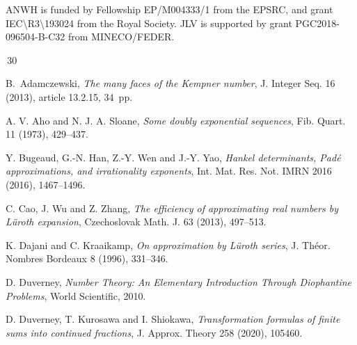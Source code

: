 \documentclass[12pt,a4paper]{amsart}
\theoremstyle{definition}
\numberwithin{equation}{section}
\begin{document}
ANWH is funded by Fellowship EP/M004333/1 from the EPSRC,  
and grant IEC\textbackslash R3\textbackslash 193024 from the Royal Society. 
JLV is supported by grant PGC2018-096504-B-C32 from MINECO/FEDER. 


\normalsize

\begin{thebibliography}{\,30\,}


\normalsize
\baselineskip=17pt

B.~Adamczewski, 
\textit{The many faces of the Kempner number}, 
J. Integer Seq. {16} (2013), article 13.2.15, 34~pp.

A. V. Aho and N. J. A. Sloane, 
\textit{Some doubly exponential sequences}, 
Fib. Quart. {11} (1973), 429--437.

Y. Bugeaud, G.-N. Han, Z.-Y. Wen and J.-Y. Yao, 
\textit{Hankel determinants, Pad\'{e} approximations, 
and irrationality exponents}, 
Int. Mat. Res. Not. IMRN {2016} (2016), 1467--1496. 
 

C. Cao, J. Wu and Z. Zhang,
\textit{The efficiency of approximating real numbers by L\"uroth expansion},
Czechoslovak Math. J. {63} (2013), 497--513.

K. Dajani and C. Kraaikamp,
\textit{On approximation by L\"{u}roth series},
J. Th\'eor. Nombres Bordeaux {8} (1996), 331--346.


 D. Duverney, 
\textit{Number Theory: An Elementary Introduction Through Diophantine Problems}, World Scientific, 2010.

D. Duverney, T. Kurosawa and I. Shiokawa,
\textit{Transformation formulas of finite sums into continued fractions},
J. Approx. Theory {258 }(2020), %
105460.


\end{thebibliography}
\end{document}
